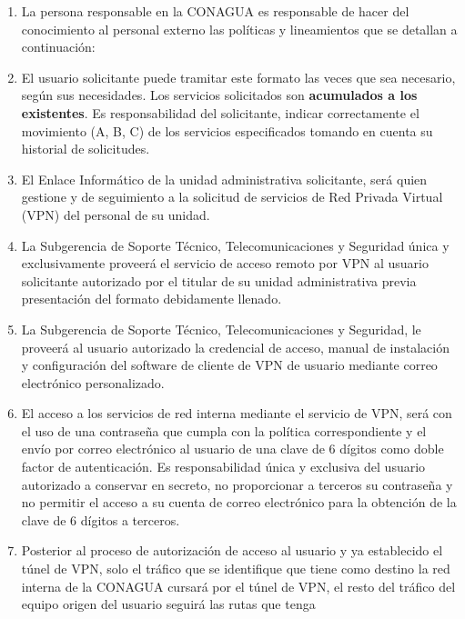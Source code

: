 \documentclass[letterpaper,11pt]{article}
\begin{document}
{  \footnotesize\begin{enumerate}
	\item La persona responsable en la CONAGUA es responsable de hacer del 
              conocimiento al personal externo las políticas y lineamientos que se detallan a continuación:
	\item El usuario solicitante puede tramitar este formato las veces que sea 
              necesario, según sus necesidades. Los servicios solicitados son \textbf {acumulados 
              a los existentes}. Es responsabilidad del solicitante, indicar correctamente 
              el movimiento (A, B, C) de los servicios especificados tomando en cuenta su 
              historial de solicitudes.
	\item El Enlace Informático de la unidad administrativa solicitante, será quien 
              gestione y de seguimiento a la solicitud de servicios de Red Privada Virtual 
              (VPN) del personal de su unidad.
	\item La Subgerencia de Soporte Técnico, Telecomunicaciones y Seguridad única y 
              exclusivamente proveerá el servicio de acceso remoto por VPN al usuario solicitante 
              autorizado por el titular de su unidad administrativa previa presentación del formato 
              debidamente llenado.
	\item La Subgerencia de Soporte Técnico, Telecomunicaciones y Seguridad, le proveerá al 
              usuario autorizado la credencial de acceso, manual de instalación y configuración del 
              software de cliente de VPN de usuario mediante correo electrónico personalizado.
	\item El acceso a los servicios de red interna mediante el servicio de VPN, será con el 
              uso de una contraseña que cumpla con la política correspondiente y el envío por correo 
              electrónico al usuario de una clave de 6 dígitos como doble factor de autenticación. 
              Es responsabilidad única y exclusiva del usuario autorizado a conservar en secreto, no 
              proporcionar a terceros su contraseña y no permitir el acceso a su cuenta de correo electrónico 
              para la obtención de la clave de 6 dígitos a terceros.
	\item Posterior al proceso de autorización de acceso al usuario y ya establecido el túnel de VPN, 
              solo el tráfico que se identifique que tiene como destino la red interna de la CONAGUA cursará 
              por el túnel de VPN, el resto del tráfico del equipo origen del usuario seguirá las rutas que tenga 

\end{enumerate}}
\end{document}

